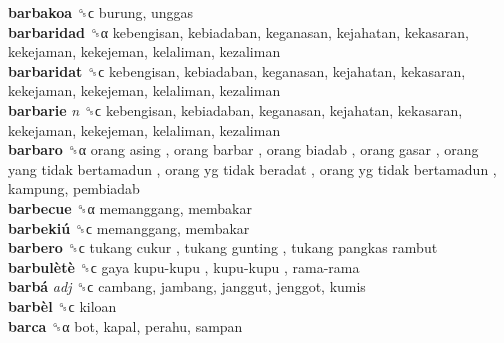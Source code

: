 \textbf{barbakoa} ␝ϲ  burung, unggas  \\
\textbf{barbaridad} ␝α  kebengisan, kebiadaban, keganasan, kejahatan, kekasaran, kekejaman, kekejeman, kelaliman, kezaliman  \\
\textbf{barbaridat} ␝ϲ  kebengisan, kebiadaban, keganasan, kejahatan, kekasaran, kekejaman, kekejeman, kelaliman, kezaliman  \\
\textbf{barbarie} \emph{n}  ␝ϲ  kebengisan, kebiadaban, keganasan, kejahatan, kekasaran, kekejaman, kekejeman, kelaliman, kezaliman  \\
\textbf{barbaro} ␝α   orang asing ,  orang barbar ,  orang biadab ,  orang gasar ,  orang yang tidak bertamadun ,  orang yg tidak beradat ,  orang yg tidak bertamadun , kampung, pembiadab  \\
\textbf{barbecue} ␝α  memanggang, membakar  \\
\textbf{barbekiú} ␝ϲ  memanggang, membakar  \\
\textbf{barbero} ␝ϲ   tukang cukur ,  tukang gunting ,  tukang pangkas rambut   \\
\textbf{barbulètè} ␝ϲ   gaya kupu-kupu ,  kupu-kupu ,  rama-rama   \\
\textbf{barbá} \emph{adj}  ␝ϲ  cambang, jambang, janggut, jenggot, kumis  \\
\textbf{barbèl} ␝ϲ  kiloan  \\
\textbf{barca} ␝α  bot, kapal, perahu, sampan  \\
